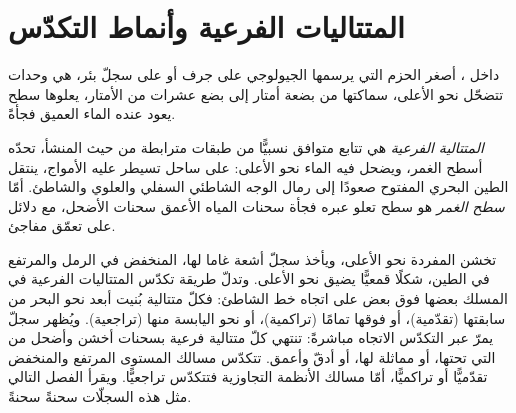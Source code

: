 \section{المتتاليات الفرعية وأنماط التكدّس}\label{sec:b3:sequence-stratigraphy:parasequences}

داخل ، أصغر الحزم التي يرسمها الجيولوجي على جرف أو على سجلّ
بئر، هي وحدات تتضحّل نحو الأعلى، سماكتها من بضعة أمتار إلى بضع
عشرات من الأمتار، يعلوها سطح يعود عنده الماء العميق فجأةً.

\begin{definition}\label{def:b3:sequence-stratigraphy:parasequence}
\emph{المتتالية الفرعية} هي تتابع متوافق نسبيًّا
من طبقات مترابطة من حيث المنشأ، تحدّه أسطح الغمر، ويضحل فيه الماء نحو الأعلى:
على ساحل تسيطر عليه الأمواج، ينتقل الطين البحري المفتوح صعودًا
إلى رمال الوجه الشاطئي السفلي والعلوي والشاطئ. أمّا
\emph{سطح الغمر} هو سطح تعلو عبره فجأة سحنات المياه الأعمق سحنات الأضحل،
مع دلائل على تعمّق مفاجئ.
\end{definition}

تخشن  المفردة نحو الأعلى، ويأخذ سجلّ أشعة غاما لها،
المنخفض في الرمل والمرتفع في الطين، شكلًا قمعيًّا يضيق نحو الأعلى. وتدلّ طريقة تكدّس
المتتاليات الفرعية في المسلك بعضها فوق بعض على اتجاه
خط الشاطئ: فكلّ متتالية بُنيت أبعد نحو البحر من سابقتها (تقدّمية)،
أو فوقها تمامًا (تراكمية)، أو نحو اليابسة منها (تراجعية). ويُظهر سجلّ يمرّ
عبر التكدّس الاتجاه مباشرةً: تنتهي كلّ متتالية فرعية بسحنات أخشن وأضحل من التي تحتها،
أو مماثلة لها، أو أدقّ وأعمق.
تتكدّس مسالك المستوى المرتفع والمنخفض تقدّميًّا أو تراكميًّا،
أمّا مسالك الأنظمة التجاوزية فتتكدّس تراجعيًّا. ويقرأ الفصل التالي مثل هذه السجلّات
سحنةً سحنةً.

